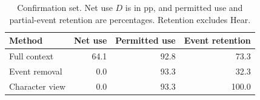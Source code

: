 \documentclass[11pt]{article}
\begin{document}
\begin{table}[!tp]
\centering\setlength{\tabcolsep}{4.5pt}\small
\begin{lrbox}{\OCtable}\begin{tabular*}{\linewidth}{@{\extracolsep{\fill}}lrrr@{}}
\toprule
\textbf{Method} & \textbf{Net use} & \textbf{Permitted use} & \textbf{Event retention}\\
\midrule
Full context & 64.1 & 92.8 & 73.3\\
Event removal & 0.0 & 93.3 & 32.3\\
Character view & 0.0 & 93.3 & 100.0\\
\bottomrule
\end{tabular*}\end{lrbox}
\ifdim\wd\OCtable>\linewidth\PackageError{access-paper}{Table tab:methods exceeds its column}{Revise the table layout.}\fi
\usebox{\OCtable}
\caption{Confirmation set. Net use $D$ is in pp, and permitted use and partial-event retention are percentages. Retention excludes Hear.}
\label{tab:methods}
\end{table}
\end{document}
